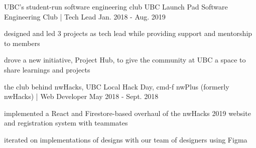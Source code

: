 \begin{cventries}

  \cventry
    {UBC's student-run software engineering club} %
    {UBC Launch Pad Software Engineering Club | Tech Lead} %
    {} %
    {Jan. 2018 - Aug. 2019} %
    {
      \begin{cvitems} %
        \item {designed and led 3 projects as tech lead while providing support and mentorship to members}
        \item {drove a new initiative, Project Hub, to give the community at UBC a space to share learnings and projects}
      \end{cvitems}
    }

  \cventry
    {the club behind nwHacks, UBC Local Hack Day, cmd-f} %
    {nwPlus (formerly nwHacks) | Web Developer} %
    {} %
    {May 2018 - Sept. 2018} %
    {
      \begin{cvitems} %
        \item {implemented a React and Firestore-based overhaul of the nwHacks 2019 website and registration system with teammates}
        \item {iterated on implementations of designs with our team of designers using Figma}
      \end{cvitems}
    }

\end{cventries}
